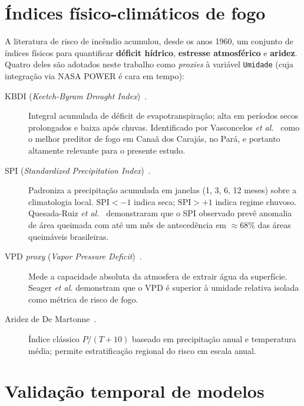 \documentclass[tcc2]{uftex}
\begin{document}
\section{Índices físico-climáticos de fogo}
\label{sec:fund_indices_fogo}

A literatura de risco de incêndio acumulou, desde os anos 1960, um conjunto de índices físicos para quantificar \textbf{déficit hídrico}, \textbf{estresse atmosférico} e \textbf{aridez}. Quatro deles são adotados neste trabalho como \emph{proxies} à variável \texttt{Umidade} (cuja integração via NASA POWER é cara em tempo):

\begin{description}
  \item[KBDI (\emph{Keetch-Byram Drought Index})~\cite{keetch1968drought}.] Integral acumulada de déficit de evapotranspiração; alta em períodos secos prolongados e baixa após chuvas. Identificado por Vasconcelos \emph{et al.}~\cite{forests2024cerradoamazon} como o melhor preditor de fogo em Canaã dos Carajás, no Pará, e portanto altamente relevante para o presente estudo.

  \item[SPI (\emph{Standardized Precipitation Index})~\cite{mckee1993spi}.] Padroniza a precipitação acumulada em janelas (1, 3, 6, 12 meses) sobre a climatologia local. \(\text{SPI} < -1\) indica seca; \(\text{SPI} > +1\) indica regime chuvoso. Quesada-Ruiz \emph{et al.}~\cite{npjhazards2025fire} demonstraram que o SPI observado prevê anomalia de área queimada com até um mês de antecedência em \(\approx 68\%\) das áreas queimáveis brasileiras.

  \item[VPD \emph{proxy} (\emph{Vapor Pressure Deficit})~\cite{seager2015climatology}.] Mede a capacidade absoluta da atmosfera de extrair água da superfície. Seager \emph{et al.} demonstram que o VPD é superior à umidade relativa isolada como métrica de risco de fogo.

  \item[Aridez de De Martonne~\cite{demartonne1926aridity}.] Índice clássico \(P / (T + 10)\) baseado em precipitação anual e temperatura média; permite estratificação regional do risco em escala anual.
\end{description}

\section{Validação temporal de modelos}
\label{sec:fund_validacao_temporal}
\end{document}
